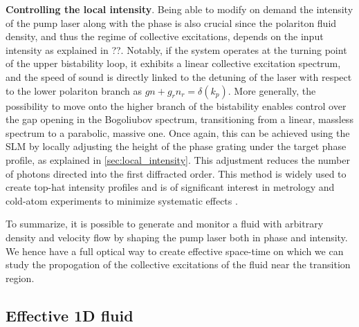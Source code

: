 \textbf{Controlling the local intensity}. Being able to modify on demand the intensity of the pump laser along with the phase is also crucial since the polariton fluid density, and thus the regime of collective excitations, depends on the input intensity as explained in ??. 
Notably, if the system operates at the turning point of the upper bistability loop, it exhibits a linear collective excitation spectrum, and the speed of sound is directly linked to the detuning of the laser with respect to the lower polariton branch as $gn+g_rn_r=\delta(k_p)$. 
More generally, the possibility to move onto the higher branch of the bistability enables control over the gap opening in the Bogoliubov spectrum, transitioning from a linear, massless spectrum to a parabolic, massive one.  
Once again, this can be achieved using the SLM by locally adjusting the height of the phase grating under the target phase profile, as explained in \autoref{sec:local_intensity}. This adjustment reduces the number of photons directed into the first diffracted order. This method is widely used to create top-hat intensity profiles and is of significant interest in metrology and cold-atom experiments to minimize systematic effects \cite{top_metrology_2018}.  

\bigskip




To summarize, it is possible to generate and monitor a fluid with arbitrary density and velocity flow by shaping the pump laser both in phase and intensity. We hence have a full optical way to create
effective space-time on which we can study the propogation of the collective excitations of the fluid near the transition region.

\subsection{Effective 1D fluid}

